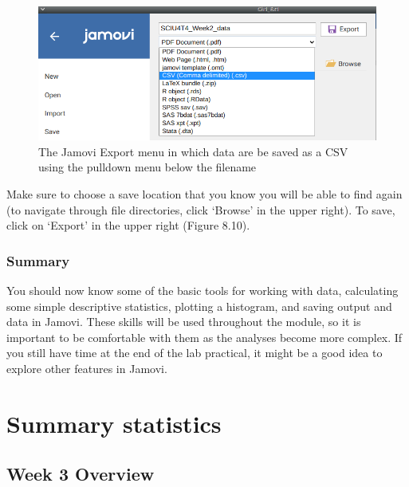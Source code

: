 \documentclass[
]{scrbook}
\begin{document}
\begin{figure}
\includegraphics[width=1\linewidth]{img/export_jamovi} \caption{The Jamovi Export menu in which data are be saved as a CSV using the pulldown menu below the filename}\label{fig:unnamed-chunk-34}
\end{figure}

Make sure to choose a save location that you know you will be able to find again (to navigate through file directories, click `Browse' in the upper right).
To save, click on `Export' in the upper right (Figure 8.10).

\hypertarget{summary-1}{%
\section{Summary}\label{summary-1}}

You should now know some of the basic tools for working with data, calculating some simple descriptive statistics, plotting a histogram, and saving output and data in Jamovi.
These skills will be used throughout the module, so it is important to be comfortable with them as the analyses become more complex.
If you still have time at the end of the lab practical, it might be a good idea to explore other features in Jamovi.

\hypertarget{part-summary-statistics}{%
\part{Summary statistics}\label{part-summary-statistics}}

\hypertarget{Week3}{%
\chapter*{Week 3 Overview}\label{Week3}}
\end{document}

